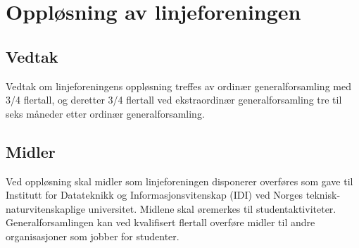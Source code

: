 \chapter{Oppløsning av linjeforeningen}
\section{Vedtak}
\vspace{23pt}

Vedtak om linjeforeningens oppløsning treffes av ordinær generalforsamling med 3/4 flertall, og deretter 3/4 flertall ved ekstraordinær generalforsamling tre til seks måneder etter ordinær generalforsamling.

\section{Midler}
\vspace{23pt}

Ved oppløsning skal midler som linjeforeningen disponerer overføres som gave til \mbox{Institutt} for Datateknikk og Informasjonsvitenskap (IDI) ved Norges teknisk-\linebreak naturvitenskaplige universitet. Midlene skal øremerkes til studentaktiviteter. Generalforsamlingen kan ved kvalifisert flertall overføre midler til andre organisasjoner som jobber for studenter.
